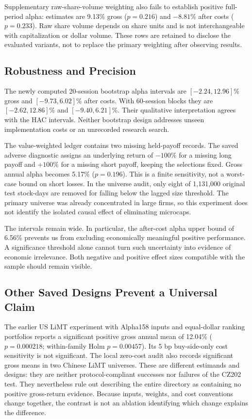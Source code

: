 \documentclass{article}
\begin{document}
Supplementary raw-share-volume weighting also fails to establish positive full-period alpha: estimates are 9.13\% gross ($p=0.216$) and $-8.81\%$ after costs ($p=0.233$). Raw share volume depends on share units and is not interchangeable with capitalization or dollar volume. These rows are retained to disclose the evaluated variants, not to replace the primary weighting after observing results.

\subsection{Robustness and Precision}
The newly computed 20-session bootstrap alpha intervals are $[-2.24,12.96]$\% gross and $[-9.73,6.02]$\% after costs. With 60-session blocks they are $[-2.62,12.86]$\% and $[-9.40,6.21]$\%. Their qualitative interpretation agrees with the HAC intervals. Neither bootstrap design addresses unseen implementation costs or an unrecorded research search.

The value-weighted ledger contains two missing held-payoff records. The saved adverse diagnostic assigns an underlying return of $-100\%$ for a missing long payoff and $+100\%$ for a missing short payoff, keeping the selections fixed. Gross annual alpha becomes 5.17\% ($p=0.196$). This is a finite sensitivity, not a worst-case bound on short losses. In the universe audit, only eight of 1,131,000 original test stock-days are removed for falling below the lagged size threshold. The primary universe was already concentrated in large firms, so this experiment does not identify the isolated causal effect of eliminating microcaps.

The intervals remain wide. In particular, the after-cost alpha upper bound of 6.56\% prevents us from excluding economically meaningful positive performance. A significance threshold alone cannot turn such uncertainty into evidence of economic irrelevance. Both negative and positive effect sizes compatible with the sample should remain visible.

\subsection{Other Saved Designs Prevent a Universal Claim}
The earlier US LiMT experiment with Alpha158 inputs and equal-dollar ranking portfolios reports a significant positive gross annual mean of 12.04\% ($p=0.000218$; within-family Holm $p=0.00457$). Its 5 bp buy-side-only cost sensitivity is not significant. The local zero-cost audit also records significant gross means in two Chinese LiMT universes. These are different estimands and designs: they are neither protocol-compliant successes nor failures of the CZ202 test. They nevertheless rule out describing the entire directory as containing no positive gross-return evidence. Because inputs, weights, and cost conventions change together, the contrast is not an ablation identifying which change explains the difference.
\end{document}

